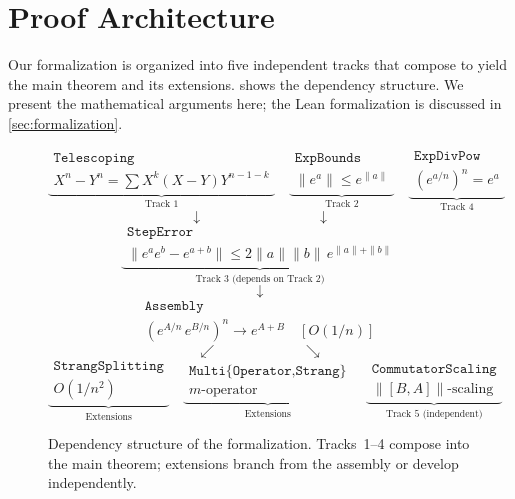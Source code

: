 \section{Proof Architecture}
\label{sec:proof}

Our formalization is organized into five independent tracks that compose to yield
the main theorem and its extensions.  shows the dependency
structure. We present the mathematical arguments here; the Lean formalization
is discussed in \cref{sec:formalization}.

\begin{figure}[ht]
\centering
\small
\[
\underbrace{
  \begin{array}{c}
  \texttt{Telescoping} \\[2pt]
  X^n - Y^n = \sum X^k(X{-}Y)Y^{n{-}1{-}k}
  \end{array}
}_{\text{Track 1}}
\quad
\underbrace{
  \begin{array}{c}
  \texttt{ExpBounds} \\[2pt]
  \|e^a\| \le e^{\|a\|}
  \end{array}
}_{\text{Track 2}}
\quad
\underbrace{
  \begin{array}{c}
  \texttt{ExpDivPow} \\[2pt]
  (e^{a/n})^n = e^a
  \end{array}
}_{\text{Track 4}}
\]
\[
\downarrow \qquad\qquad\qquad\qquad \downarrow
\]
\[
\underbrace{
  \begin{array}{c}
  \texttt{StepError} \\[2pt]
  \|e^a e^b - e^{a+b}\| \le 2\|a\|\|b\|\,e^{\|a\|+\|b\|}
  \end{array}
}_{\text{Track 3 (depends on Track 2)}}
\]
\[
\downarrow
\]
\[
\boxed{
  \begin{array}{c}
  \texttt{Assembly} \\[2pt]
  (e^{A/n}\,e^{B/n})^n \to e^{A+B} \quad [O(1/n)]
  \end{array}
}
\]
\[
\swarrow \qquad\qquad\qquad \searrow
\]
\[
\underbrace{
  \begin{array}{c}
  \texttt{StrangSplitting} \\[2pt]
  O(1/n^2)
  \end{array}
}_{\text{Extensions}}
\quad
\underbrace{
  \begin{array}{c}
  \texttt{Multi\{Operator,Strang\}} \\[2pt]
  m\text{-operator}
  \end{array}
}_{\text{Extensions}}
\quad
\underbrace{
  \begin{array}{c}
  \texttt{CommutatorScaling} \\[2pt]
  \|[B,A]\|\text{-scaling}
  \end{array}
}_{\text{Track 5 (independent)}}
\]
\caption{Dependency structure of the formalization.
  Tracks~1--4 compose into the main theorem; extensions branch from the
  assembly or develop independently.}
\label{fig:dag}
\end{figure}

